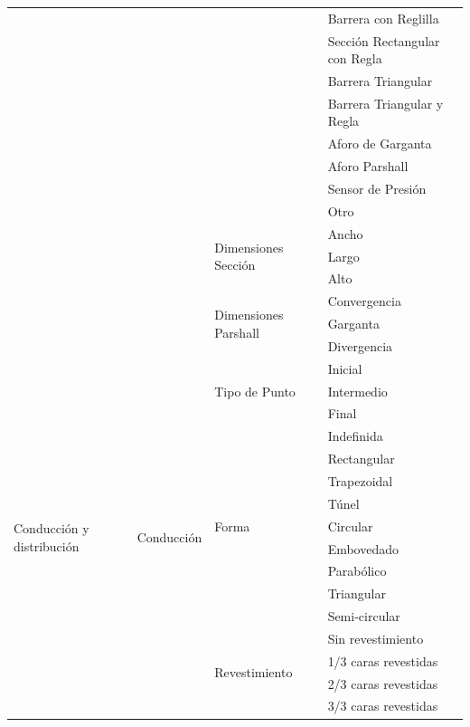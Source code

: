 \documentclass[]{article}
\begin{document}
\begin{longtable}{|p{3cm}|p{3.5cm}|p{3.5cm}|p{3.5cm}|}
    & & & Barrera con Reglilla\\    \cline{4-4}
    & & & Sección Rectangular con Regla\\    \cline{4-4}
    & & & Barrera Triangular\\    \cline{4-4}
    & & & Barrera Triangular y Regla\\    \cline{4-4}
    & & & Aforo de Garganta\\    \cline{4-4}
    & & & Aforo Parshall\\    \cline{4-4}
    & & & Sensor de Presión\\    \cline{4-4}
    & & & Otro\\    \cline{3-4}
    & & \multirow {3}{3.5cm}{Dimensiones Sección} & Ancho\\    \cline{4-4}
    & & & Largo\\    \cline{4-4}
    & & & Alto\\    \cline{3-4}
    & & \multirow {3}{3.5cm}{Dimensiones Parshall} & Convergencia\\    \cline{4-4}
    & & & Garganta\\    \cline{4-4}
    & & & Divergencia\\     \hline   
    \multirow {29}{3cm}{Conducción y distribución} & \multirow {29}{3.5cm}{Conducción} & \multirow {3}{3.5cm}{Tipo de Punto} &  Inicial\\	\cline{4-4}
	& & & Intermedio\\	\cline{4-4}
	& & & Final\\    \cline{3-4}
    & & \multirow {9}{3.5cm}{Forma} & Indefinida\\    \cline{4-4}
    & & & Rectangular\\    \cline{4-4}
    & & & Trapezoidal\\    \cline{4-4}
    & & & Túnel\\    \cline{4-4}
    & & & Circular\\    \cline{4-4}
    & & & Embovedado\\    \cline{4-4}
    & & & Parabólico\\    \cline{4-4}
    & & & Triangular\\    \cline{4-4}
    & & & Semi-circular\\    \cline{3-4}
	& & \multirow {4}{3.5cm}{Revestimiento} & Sin revestimiento\\    \cline{4-4}
    & & & 1/3 caras revestidas\\    \cline{4-4}
    & & & 2/3 caras revestidas\\    \cline{4-4}
    & & & 3/3 caras revestidas\\    \cline{3-4}  

\end{longtable}
\end{document}
